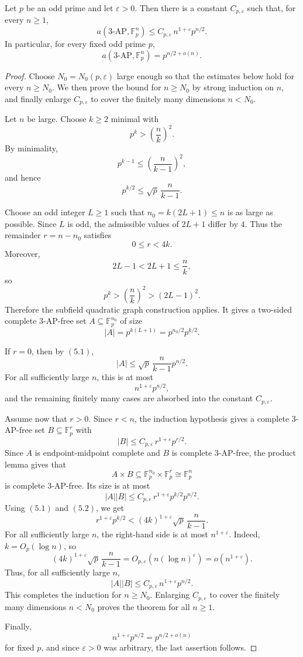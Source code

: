 \documentclass[10pt,a4paper]{amsart}
\begin{document}
	\begin{theorem}
		Let \(p\) be an odd prime and let \(\varepsilon>0\).  Then there is a constant
		\(C_{p,\varepsilon}\) such that, for every \(n\ge1\),
		\[
		a(3\text{-}\mathrm{AP},\mathbb F_p^n)
		\le
		C_{p,\varepsilon}\,n^{1+\varepsilon}p^{n/2}.
		\]
		In particular, for every fixed odd prime \(p\),
		\[
		a(3\text{-}\mathrm{AP},\mathbb F_p^n)
		=
		p^{n/2+o(n)}.
		\]
	\end{theorem}

	\begin{proof}
		Choose \(N_0=N_0(p,\varepsilon)\) large enough so that the estimates below hold
		for every \(n\ge N_0\).  We then prove the bound for \(n\ge N_0\) by strong
		induction on \(n\), and finally enlarge \(C_{p,\varepsilon}\) to cover the
		finitely many dimensions \(n<N_0\).
		
		Let \(n\) be large.  Choose \(k\ge2\) minimal with
		\[
		p^k>\left(\frac nk\right)^2 .
		\]
		By minimality,
		\[
		p^{k-1}\le \left(\frac{n}{k-1}\right)^2,
		\]
		and hence
		\[
		p^{k/2}
		\le
		\sqrt p\,\frac{n}{k-1}.
		\tag{5.1}
		\]
		
		Choose an odd integer \(L\ge1\) such that
		$ n_0=k(2L+1)\le n$
		is as large as possible.  Since \(L\) is odd, the admissible values of
		\(2L+1\) differ by \(4\).  Thus the remainder
		$ r=n-n_0$
		satisfies
		\[
		0\le r<4k .
		\tag{5.2}
		\]
		Moreover,
		\[
		2L-1<2L+1\le \frac nk,
		\]
		so
		\[
		p^k>\left(\frac nk\right)^2>(2L-1)^2 .
		\]
		Therefore the subfield quadratic graph construction applies.  It gives a two-sided
		complete \(3\)-AP-free set $A\subseteq \mathbb F_p^{n_0}$
		of size
		\[
		|A|
		=
		p^{k(L+1)}
		=
		p^{n_0/2}p^{k/2}.
		\]
		
		If \(r=0\), then by \((5.1)\),
		\[
		|A|
		\le
		\sqrt p\,\frac{n}{k-1}p^{n/2}.
		\]
		For all sufficiently large \(n\), this is at most
		\[
		n^{1+\varepsilon}p^{n/2},
		\]
		and the remaining finitely many cases are absorbed into the constant
		\(C_{p,\varepsilon}\).
		
		Assume now that \(r>0\).  Since \(r<n\), the induction hypothesis gives a
		complete \(3\)-AP-free set
		$ B\subseteq \mathbb F_p^r$
		with
		\[
		|B|\le
		C_{p,\varepsilon}\,r^{1+\varepsilon}p^{r/2}.
		\]
		Since \(A\) is endpoint-midpoint complete  and \(B\) is complete \(3\)-AP-free, the
		product lemma gives that
		\[
		A\times B
		\subseteq
		\mathbb F_p^{n_0}\times\mathbb F_p^r
		\cong
		\mathbb F_p^n
		\]
		is complete \(3\)-AP-free.  Its size is at most
		\[
		|A||B|
		\le
		C_{p,\varepsilon}\,
		r^{1+\varepsilon}p^{k/2}p^{n/2}.
		\]
		Using \((5.1)\) and \((5.2)\), we get
		\[
		r^{1+\varepsilon}p^{k/2}
		<
		(4k)^{1+\varepsilon}
		\sqrt p\,\frac{n}{k-1}.
		\]
		For all sufficiently large \(n\), the right-hand side is at most
		$   n^{1+\varepsilon}.$
		Indeed, \(k=O_p(\log n)\), so
		\[
		(4k)^{1+\varepsilon}\sqrt p\,\frac{n}{k-1}
		=
		O_{p,\varepsilon}\!\left(n(\log n)^\varepsilon\right)
		=
		o\!\left(n^{1+\varepsilon}\right).
		\]
		Thus, for all sufficiently large \(n\),
		\[
		|A||B|
		\le
		C_{p,\varepsilon}\,n^{1+\varepsilon}p^{n/2}.
		\]
		This completes the induction for \(n\ge N_0\).  Enlarging
		\(C_{p,\varepsilon}\) to cover the finitely many dimensions \(n<N_0\) proves
		the theorem for all \(n\ge1\).
		
		Finally,
		\[
		n^{1+\varepsilon}p^{n/2}=p^{n/2+o(n)}
		\]
		for fixed \(p\), and since \(\varepsilon>0\) was arbitrary, the last assertion
		follows.
	\end{proof}
\end{document}
